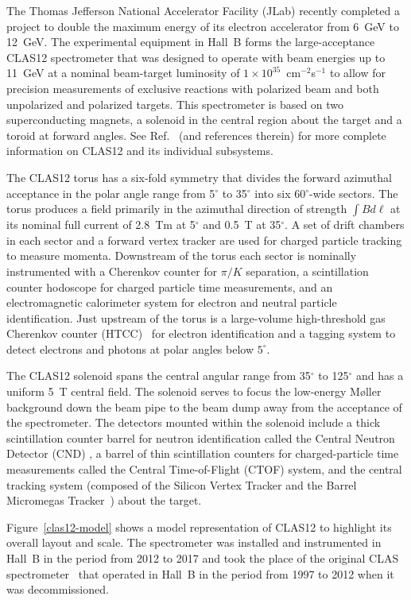 \documentclass[3p,times,twocolumn]{elsarticle}
\begin{document}
The Thomas Jefferson National Accelerator Facility (JLab) recently completed a project to double the
maximum energy of its electron accelerator from 6~GeV to 12~GeV. The experimental equipment in
Hall~B forms the large-acceptance CLAS12 spectrometer that was designed to operate with beam
energies up to 11~GeV at a nominal beam-target luminosity of $1 \times 10^{35}$~cm$^{-2}$s$^{-1}$ to
allow for precision measurements of exclusive reactions with polarized beam and both unpolarized and
polarized targets. This spectrometer is based on two superconducting magnets, a solenoid in the central
region about the target and a toroid at forward angles. See Ref.~\cite{overview-nim} (and references
therein) for more complete information on CLAS12 and its individual subsystems. 

The CLAS12 torus has a six-fold symmetry that divides the forward azimuthal acceptance in the polar angle
range from 5$^\circ$ to 35$^\circ$ into six 60$^\circ$-wide sectors. The torus produces a field primarily in
the azimuthal direction of strength $\int \!B d\ell$ at its nominal full current of 2.8~Tm at 5$^\circ$ and
0.5~T at 35$^\circ$. A set of drift chambers in each sector and a forward vertex tracker are used for
charged particle tracking to measure momenta. Downstream of the torus each sector is nominally instrumented
with a Cherenkov counter for $\pi/K$ separation, a scintillation counter hodoscope for charged particle time
measurements, and an electromagnetic calorimeter system for electron and neutral particle identification.
Just upstream of the torus is a large-volume high-threshold gas Cherenkov counter (HTCC)~\cite{htcc-nim}
for electron identification and a tagging system to detect electrons and photons at polar angles below $5^\circ$.

The CLAS12 solenoid spans the central angular range from 35$^\circ$ to 125$^\circ$ and has a uniform 5~T
central field. The solenoid serves to focus the low-energy M{\o}ller background down the beam pipe to the
beam dump away from the acceptance of the spectrometer. The detectors mounted within the solenoid include
a thick scintillation counter barrel for neutron identification called the Central Neutron Detector (CND)
\cite{cnd-nim}, a barrel of thin scintillation counters for charged-particle time measurements called the Central
Time-of-Flight (CTOF) system, and the central tracking system (composed of the Silicon Vertex Tracker
\cite{svt-nim} and the Barrel Micromegas Tracker~\cite{mm-nim}) about the target.

Figure~\ref{clas12-model} shows a model representation of CLAS12 to highlight its overall layout and scale. The
spectrometer was installed and instrumented in Hall~B in the period from 2012 to 2017 and took the place of the
original CLAS spectrometer~\cite{clas-nim} that operated in Hall~B in the period from 1997 to 2012 when it was
decommissioned.
\end{document}
